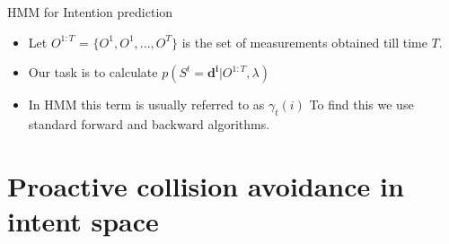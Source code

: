 \documentclass{beamer}
\begin{document}
\begin{frame}{HMM for Intention prediction}
\begin{itemize}
\item{Let $O^{1:T}$ = $\{O^1,O^1,...,O^T\}$ is the set of measurements obtained till time $T$.}
\item{Our task is to calculate $p(S^t = \mathbf{d^i} | O^{1:T} 
,\lambda)$}

\item{ In HMM this term is usually referred to as $\gamma_t(i)$ To find this we use standard forward and backward algorithms.}
\end{itemize}

\end{frame}


\section{Proactive collision avoidance in intent space}
\end{document}
